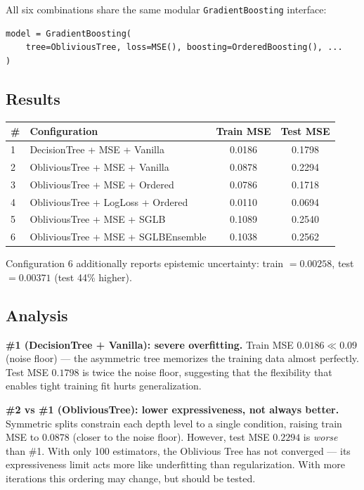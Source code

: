 \documentclass[11pt, a4paper]{article}
\begin{document}
All six combinations share the same modular \texttt{GradientBoosting}
interface:
\begin{verbatim}
model = GradientBoosting(
    tree=ObliviousTree, loss=MSE(), boosting=OrderedBoosting(), ...
)
\end{verbatim}

\subsection{Results}

\begin{center}
\begin{tabular}{llcc}
\toprule
\textbf{\#} & \textbf{Configuration} & \textbf{Train MSE} & \textbf{Test MSE} \\
\midrule
1 & DecisionTree + MSE + Vanilla        & 0.0186 & 0.1798 \\
2 & ObliviousTree + MSE + Vanilla       & 0.0878 & 0.2294 \\
3 & ObliviousTree + MSE + Ordered       & 0.0786 & 0.1718 \\
4 & ObliviousTree + LogLoss + Ordered   & 0.0110 & 0.0694 \\
5 & ObliviousTree + MSE + SGLB          & 0.1089 & 0.2540 \\
6 & ObliviousTree + MSE + SGLBEnsemble  & 0.1038 & 0.2562 \\
\bottomrule
\end{tabular}
\end{center}

Configuration 6 additionally reports epistemic uncertainty:
train $= 0.00258$, test $= 0.00371$ (test 44\% higher).

\subsection{Analysis}

\textbf{\#1 (DecisionTree + Vanilla): severe overfitting.}
Train MSE $0.0186 \ll 0.09$ (noise floor) --- the asymmetric tree
memorizes the training data almost perfectly.
Test MSE $0.1798$ is twice the noise floor, suggesting that the
flexibility that enables tight training fit hurts generalization.

\textbf{\#2 vs \#1 (ObliviousTree): lower expressiveness, not always better.}
Symmetric splits constrain each depth level to a single condition,
raising train MSE to $0.0878$ (closer to the noise floor).
However, test MSE $0.2294$ is \emph{worse} than \#1.
With only 100 estimators, the Oblivious Tree has not converged ---
its expressiveness limit acts more like underfitting than regularization.
With more iterations this ordering may change, but should be tested.
\end{document}
